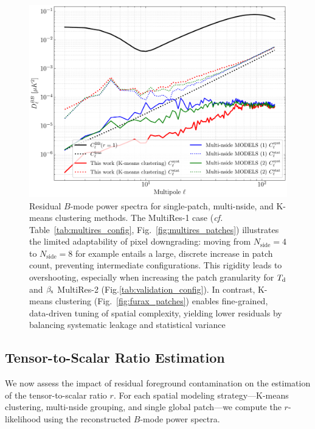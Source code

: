\documentclass[fleqn,usenatbib]{mnras}
\begin{document}
\begin{figure}
    \centering
    \includegraphics[width=\linewidth]{figures/bb_residual_spectra.pdf}
    \caption{
    Residual \( B \)-mode power spectra for single-patch, multi-nside, and K-means clustering methods. 
    The MultiRes-1 case (\textit{cf.} Table~\ref{tab:multires_config}, Fig.~\ref{fig:multires_patches}) illustrates the limited adaptability of pixel downgrading: moving from \(N_{\mathrm{side}} = 4\) to \(N_{\mathrm{side}} = 8\) for example entails a large, discrete increase in patch count, preventing intermediate configurations. 
    This rigidity leads to overshooting, especially when increasing the patch granularity for \(T_{\rm d}\) and \(\beta_{\rm s}\) MultiRes-2 (Fig.\ref{tab:validation_config}).
    In contrast, K-means clustering (Fig.~\ref{fig:furax_patches}) enables fine-grained, data-driven tuning of spatial complexity, yielding lower residuals by balancing systematic leakage and statistical variance
    }
    \label{fig:bb_spectra_comparison}
\end{figure}

\subsection{Tensor-to-Scalar Ratio Estimation}
\label{subsec:r_estimation}

We now assess the impact of residual foreground contamination on the estimation of the tensor-to-scalar ratio \( r \).
For each spatial modeling strategy—K-means clustering, multi-nside grouping, and single global patch—we compute the \( r \)-likelihood using the reconstructed \( B \)-mode power spectra.
\end{document}
